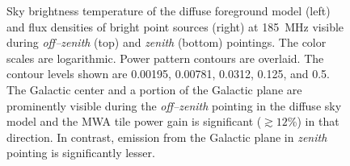 \documentclass[preprint2,iop,numberedappendix,twocolappendix,appendixfloats]{emulateapj}
\begin{document}
\begin{figure}[htb]
\centering
\caption{Sky brightness temperature of the diffuse foreground model (left) and flux densities of bright point sources (right) at 185~MHz visible during {\it off--zenith} (top) and {\it zenith} (bottom) pointings. The color scales are logarithmic. Power pattern contours are overlaid. The contour levels shown are 0.00195, 0.00781, 0.0312, 0.125, and 0.5. The Galactic center and a portion of the Galactic plane are prominently visible during the {\it off--zenith} pointing in the diffuse sky model and the MWA tile power gain is significant ($\gtrsim 12$\%) in that direction. In contrast, emission from the Galactic plane in {\it zenith} pointing is significantly lesser.}
\label{fig:sky-model-MWA}
\end{figure}
\end{document}
